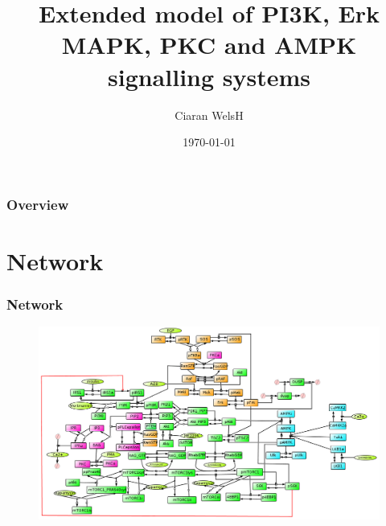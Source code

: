 \documentclass{beamer}
\title[ExtendedModel]{Extended model of PI3K, Erk MAPK, PKC and AMPK signalling systems} %
\author{Ciaran WelsH} %
\institute[Newcastle University] %
{
Newcastle University \\ %
\medskip
\textit{ciaran.welsh@newcastle.ac.uk} %
}
\date{\today} %
\begin{document}
\begin{frame}
\titlepage %
\end{frame}

\begin{frame}
\frametitle{Overview} %
\tableofcontents %
\end{frame}


\section{Network} %
\begin{frame}
\frametitle{Network}
\begin{figure}
    \centering
    \includegraphics[width=\textwidth]{../networks/extended_network.png}
\end{figure}
\end{frame}
\end{document}
